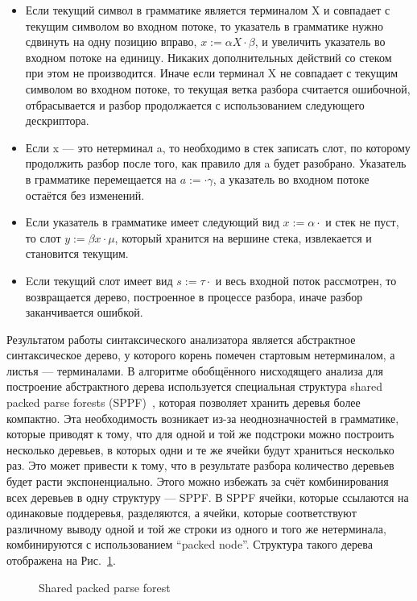 \begin{itemize}
\item Если текущий символ в грамматике является терминалом X и совпадает с текущим символом во входном потоке, то указатель в грамматике нужно сдвинуть на одну позицию вправо, $x := \alpha X \cdot \beta$, и увеличить указатель во входном потоке на единицу. Никаких дополнительных действий со стеком при этом не производится. Иначе если терминал X не совпадает с текущим символом во входном потоке, то текущая ветка разбора считается ошибочной, отбрасывается и разбор продолжается с использованием следующего дескриптора.
\item Если x --- это нетерминал a, то необходимо в стек записать слот, по которому продолжить разбор после того, как правило для a будет разобрано. Указатель в грамматике перемещается на $a := \cdot \gamma$, а указатель во входном потоке остаётся без изменений.
\item Если указатель в грамматике имеет следующий вид $x := \alpha \cdot$ и стек не пуст, то слот $y := \beta x \cdot \mu$, который хранится на вершине стека, извлекается и становится текущим.
\item Eсли текущий слот имеет вид $s := \tau \cdot$ и весь входной поток рассмотрен, то возвращается дерево, построенное в процессе разбора, иначе разбор заканчивается ошибкой.
\end{itemize}

Результатом работы синтаксического анализатора является абстрактное синтаксическое дерево, у которого корень помечен стартовым нетерминалом, а листья --- терминалами. В алгоритме обобщённого нисходящего анализа для построение абстрактного дерева используется специальная структура shared packed parse forests (SPPF)~\cite{rekers}, которая позволяет хранить деревья более компактно. Эта необходимость возникает из-за неоднозначностей в грамматике, которые приводят к тому, что для одной и той же подстроки можно построить несколько деревьев, в которых одни и те же ячейки будут храниться несколько раз. Это может привести к тому, что в результате разбора количество деревьев будет расти экспоненциально. Этого можно избежать за счёт комбинирования всех деревьев в одну структуру --- SPPF. В SPPF ячейки, которые ссылаются на одинаковые поддеревья, разделяются, а ячейки, которые соответствуют различному выводу одной и той же строки из одного и того же нетерминала, комбинируются с использованием “packed node”. Структура такого дерева отображена на Рис.~\ref{fig2}. 

\begin{figure}[h]
\caption{Shared packed parse forest}
\label{fig2}
\end{figure}

